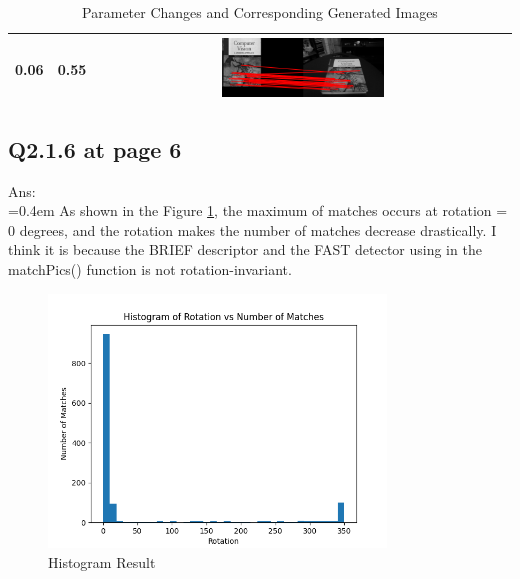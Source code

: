 \documentclass{article}
\begin{document}
\begin{table}[H]
\begin{tabular}{|c|c|c|}
			\hline
			0.06 & 0.55 & \includegraphics[width=0.4\textwidth]{Q2_1_4_0.06_0.55.png} \\
			\hline
		\end{tabular}
		\caption{Parameter Changes and Corresponding Generated Images}
		\label{table:exp}
	\end{table}

	\newpage
	\subsection*{Q2.1.6 at page 6}
	Ans:\\
	\hangindent=0.4em \hspace{0.3em} As shown in the Figure \ref{fig:hist_res}, the maximum of matches occurs at rotation = 0 degrees, and the rotation makes the number of matches decrease drastically. I think it is because the BRIEF descriptor and the FAST detector using in the matchPics() function is not rotation-invariant.
	
	\begin{figure}[H]		
		\centering
		\includegraphics[width=0.8\textwidth]{Q2_1_6.png}  %
		\caption{Histogram Result}
		\label{fig:hist_res}
	\end{figure}	
	
\end{document}
